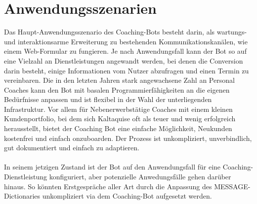 \label{Anwendungsszenarien}
\chapter{Anwendungsszenarien}

Das Haupt-Anwendungsszenario des Coaching-Bots besteht darin, als wartungs- und interaktionsarme Erweiterung zu bestehenden Kommunikationskanälen, wie einem Web-Formular zu fungieren. Je nach Anwendungsfall kann der Bot so auf eine Vielzahl an Dienstleistungen angewandt werden, bei denen die Conversion darin besteht, einige Informationen vom Nutzer abzufragen und einen Termin zu vereinbaren. Die in den letzten Jahren stark angewachsene Zahl an Personal Coaches kann den Bot mit basalen Programmierfähigkeiten an die eigenen Bedürfnisse anpassen und ist flexibel in der Wahl der unterliegenden Infrastruktur. Vor allem für Nebenerwerbstätige Coaches mit einem kleinen Kundenportfolio, bei dem sich Kaltaquise oft als teuer und wenig erfolgreich herausstellt, bietet der Coaching Bot eine einfache Möglichkeit, Neukunden kostenfrei und einfach onzuboarden. Der Prozess ist unkompliziert, unverbindlich, gut dokumentiert und einfach zu adaptieren. \\
\\
In seinem jetzigen Zustand ist der Bot auf den Anwendungsfall für eine Coaching-Dienstleistung konfiguriert, aber potenzielle Anwedungsfälle gehen darüber hinaus. So könnten Erstgespräche aller Art durch die Anpassung des MESSAGE-Dictionaries unkompliziert via dem Coaching-Bot aufgesetzt werden.
\\
